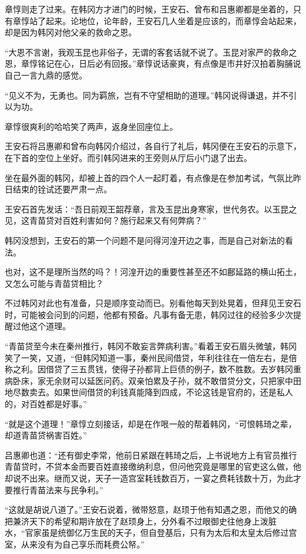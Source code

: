 章惇则走了过来。在韩冈方才进门的时候，王安石、曾布和吕惠卿都是坐着的，只有章惇站了起来。论地位，论年龄，王安石几人坐着是应该的，而章惇会站起来，却是因为韩冈对他父亲的救命之恩。

“大恩不言谢，我观玉昆也非俗子，无谓的客套话就不说了。玉昆对家严的救命之恩，章惇铭记在心，日后必有回报。”章惇说话豪爽，有点像是市井好汉拍着胸脯说自己一言九鼎的感觉。

“见义不为，无勇也。同为羁旅，岂有不守望相助的道理。”韩冈说得谦退，并不引以为功。

章惇很爽利的哈哈笑了两声，返身坐回座位上。

王安石将吕惠卿和曾布向韩冈介绍过，各自行了礼后，韩冈便在王安石的示意下，在下首的空位上坐好。而引韩冈进来的王旁则从厅后小门退了出去。

坐在最外面的韩冈，却被上首的四个人一起盯着，有点像是在参加考试，气氛比昨日结束的铨试还要严肃一点。

王安石首先发话：“吾日前观王韶荐章，言及玉昆出身寒家，世代务农。以玉昆之见，这青苗贷对百姓利害如何？施行起来又有何弊病？”

韩冈没想到，王安石的第一个问题不是问得河湟开边之事，而是自己对新法的看法。

也对，这不是理所当然的吗？！河湟开边的重要性甚至还不如鄜延路的横山拓土，又怎么可能与青苗贷相比？

不过韩冈对此也有准备，只是顺序变动而已。别看他每天到处晃着，但拜见王安石时，可能被会问到的问题，他都有预备。凡事有备无患，韩冈过往的经验多少次提醒过他这个道理。

“青苗贷至今未在秦州推行，韩冈不敢妄言弊病利害。”看着王安石眉头微皱，韩冈笑了一笑，又道，“但韩冈知道一事，秦州民间借贷，年利往往在一倍左右，是倍称之利。因借贷了三五贯钱，使得子孙都背上巨债的例子，数不胜数。去岁韩冈重病卧床，家无余财可以延医问药。双亲怕累及子孙，就不敢借贷分文，只把家中田地尽数卖去。如果世间借贷的利钱真能降到四成，不论这钱是官府的，还是私人的，对百姓都是好事。”

“就是这个道理！”章惇立刻接话，却是在作哏一般的帮着韩冈，“可恨韩琦之辈，却道青苗贷祸害百姓。”

吕惠卿也道：“还有御史李常，他前日紧跟在韩琦之后，上书说地方上有官员推行青苗贷时，不贷本金而要百姓直接缴纳利息，但问他究竟是哪里的官吏这么做，他却说不出来。继而又说，天子一造宫室耗钱数百万，一宴之费耗钱数十万，为此才要推行青苗法来与民争利。”

“这就是胡说八道了。”王安石说着，微带怒意，赵顼于他有知遇之恩，而他又的确把兼济天下的希望和期许放在了赵顼身上，分外看不过眼御史往他身上泼脏水，“官家虽是统御亿万生民的天子，但自登基后，只有为太后和太皇太后修过宫室，从来没有为自己享乐而耗费公帑。”

